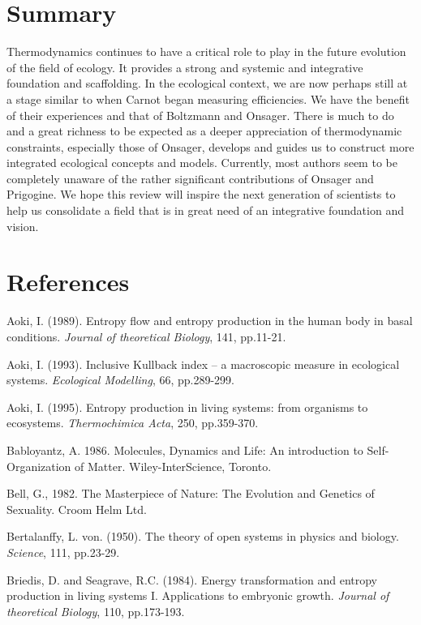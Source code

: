 \documentclass[11pt,letterpaper,]{paper}
\begin{document}
\section{Summary}\label{summary}

Thermodynamics continues to have a critical role to play in the future
evolution of the field of ecology. It provides a strong and systemic and
integrative foundation and scaffolding. In the ecological context, we
are now perhaps still at a stage similar to when Carnot began measuring
efficiencies. We have the benefit of their experiences and that of
Boltzmann and Onsager. There is much to do and a great richness to be
expected as a deeper appreciation of thermodynamic constraints,
especially those of Onsager, develops and guides us to construct more
integrated ecological concepts and models. Currently, most authors seem
to be completely unaware of the rather significant contributions of
Onsager and Prigogine. We hope this review will inspire the next
generation of scientists to help us consolidate a field that is in great
need of an integrative foundation and vision.

\section{References}\label{references}

Aoki, I. (1989). Entropy flow and entropy production in the human body
in basal conditions. \emph{Journal of theoretical Biology}, 141,
pp.11-21.

Aoki, I. (1993). Inclusive Kullback index -- a macroscopic measure in
ecological systems. \emph{Ecological Modelling}, 66, pp.289-299.

Aoki, I. (1995). Entropy production in living systems: from organisms to
ecosystems. \emph{Thermochimica Acta}, 250, pp.359-370.

Babloyantz, A. 1986. Molecules, Dynamics and Life: An introduction to
Self-Organization of Matter. Wiley-InterScience, Toronto.

Bell, G., 1982. The Masterpiece of Nature: The Evolution and Genetics of
Sexuality. Croom Helm Ltd.~

Bertalanffy, L. von. (1950). The theory of open systems in physics and
biology. \emph{Science}, 111, pp.23-29.

Briedis, D. and Seagrave, R.C. (1984). Energy transformation and entropy
production in living systems I. Applications to embryonic growth.
\emph{Journal of theoretical Biology}, 110, pp.173-193.
\end{document}
